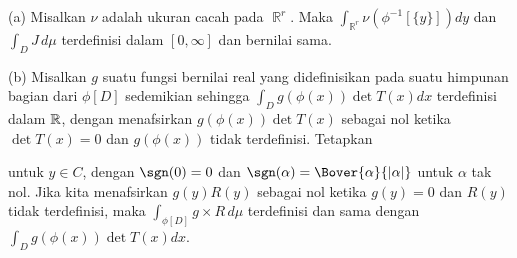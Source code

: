 (a) Misalkan $\nu$ adalah ukuran cacah pada $\BbbR^r$.   Maka
$\int_{\BbbR^r}\nu(\phi^{-1}[\{y\}])dy$ dan
$\int_DJ\,d\mu$ terdefinisi dalam $[0,\infty]$ dan bernilai sama.

(b) Misalkan $g$ suatu fungsi bernilai real yang didefinisikan pada suatu himpunan
bagian dari $\phi[D]$
sedemikian sehingga $\int_Dg(\phi(x))\det T(x)dx$ terdefinisi dalam $\Bbb R$,
dengan menafsirkan $g(\phi(x))\det T(x)$ sebagai nol ketika $\det T(x)=0$ dan
$g(\phi(x))$ tidak terdefinisi.   Tetapkan


\noindent untuk $y\in C$, dengan $\sgn(0)=0$ dan
$\sgn(\alpha)=\Bover{\alpha}{|\alpha|}$ untuk $\alpha$ tak nol.
Jika kita menafsirkan $g(y)R(y)$ sebagai nol ketika $g(y)=0$ dan $R(y)$ tidak terdefinisi,
maka $\int_{\phi[D]}g\times R\,d\mu$ terdefinisi dan sama dengan
$\int_Dg(\phi(x))\det T(x)dx$.

